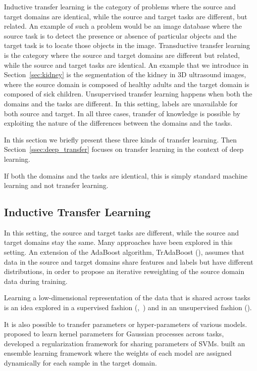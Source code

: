 Inductive transfer learning is the category of problems where the source and target domains are identical, while the source and target tasks are different, but related. An example of such a problem would be an image database where the source task is to detect the presence or absence of particular objects and the target task is to locate those objects in the image. Transductive transfer learning is the category where the source and target domains are different but related, while the source and target tasks are identical. An example that we introduce in Section~\ref{sec:kidney} is the segmentation of the kidney in 3D ultrasound images, where the source domain is composed of healthy adults and the target domain is composed of sick children. Unsupervised transfer learning happens when both the domains and the tasks are different. In this setting, labels are unavailable for both source and target. In all three cases, transfer of knowledge is possible by exploiting the nature of the differences between the domains and the tasks.

In this section we briefly present these three kinds of transfer learning. Then Section~\ref{ssec:deep_transfer} focuses on transfer learning in the context of deep learning.

If both the domains and the tasks are identical, this is simply standard machine learning and not transfer learning.

\subsection{Inductive Transfer Learning}
\label{ssec:inductive}

In this setting, the source and target tasks are different, while the source and target domains stay the same. Many approaches have been explored in this setting. An extension of the AdaBoost algorithm, TrAdaBoost (\textcite{dai2007ICML}), assumes that data in the source and target domains share features and labels but have different distributions, in order to propose an iterative reweighting of the source domain data during training. 

Learning a low-dimensional representation of the data that is shared across tasks is an idea explored in a supervised fashion (\textcite{argyriou2006NIPS},~\textcite{lee2007ICML}) and in an unsupervised fashion (\textcite{raina2007ICML}).

It is also possible to transfer parameters or hyper-parameters of various models. \textcite{lawrence2004ICML} proposed to learn kernel parameters for Gaussian processes across tasks,~\textcite{evgeniou2004} developed a regularization framework for sharing parameters of SVMs. \textcite{gao2008} built an ensemble learning framework where the weights of each model are assigned dynamically for each sample in the target domain.

